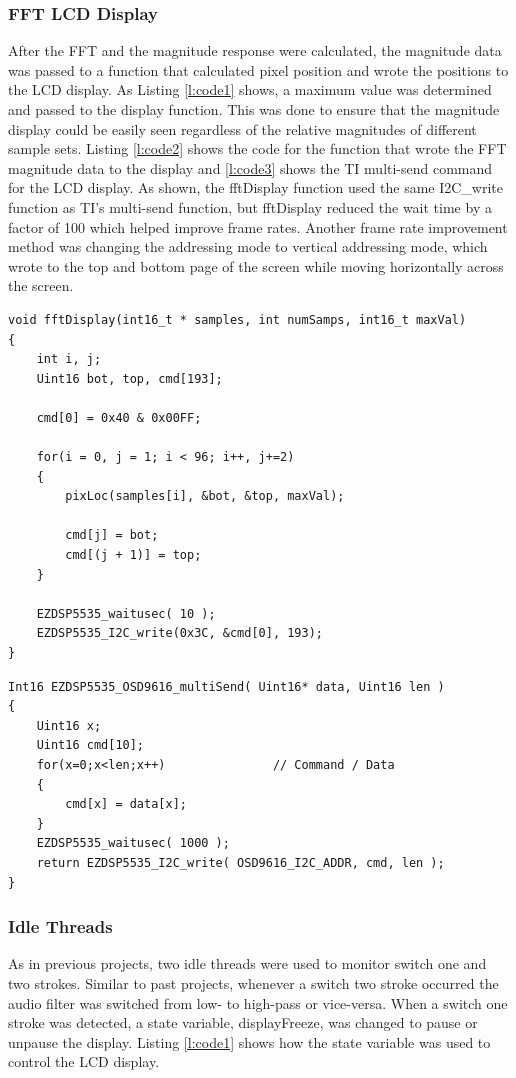 \documentclass[11pt,pdftex,portrait,letterpaper]{article}
\begin{document}
\subsubsection {FFT LCD Display}
After the FFT and the magnitude response were calculated, the magnitude data was passed to a function that calculated pixel position and wrote the positions to the LCD display. As Listing \ref{l:code1} shows, a maximum value was determined and passed to the display function. This was done to ensure that the magnitude display could be easily seen regardless of the relative magnitudes of different sample sets. Listing \ref{l:code2} shows the code for the function that wrote the FFT magnitude data to the display and \ref{l:code3} shows the TI multi-send command for the LCD display. As shown, the fftDisplay function used the same I2C\_write function as TI's multi-send function, but fftDisplay reduced the wait time by a factor of 100 which helped improve frame rates. Another frame rate improvement method was changing the addressing mode to vertical addressing mode, which wrote to the top and bottom page of the screen while moving horizontally across the screen. 

\begin{lstlisting}[caption={LCD display function}, label=l:code2]
void fftDisplay(int16_t * samples, int numSamps, int16_t maxVal)
{
	int i, j;
	Uint16 bot, top, cmd[193];

	cmd[0] = 0x40 & 0x00FF;

	for(i = 0, j = 1; i < 96; i++, j+=2)
	{
		pixLoc(samples[i], &bot, &top, maxVal);

		cmd[j] = bot;
		cmd[(j + 1)] = top;
	}

	EZDSP5535_waitusec( 10 );
	EZDSP5535_I2C_write(0x3C, &cmd[0], 193);
}
\end{lstlisting}

\begin{lstlisting}[caption={TI LCD multi-send function}, label=l:code3]
Int16 EZDSP5535_OSD9616_multiSend( Uint16* data, Uint16 len )
{
    Uint16 x;
    Uint16 cmd[10];
    for(x=0;x<len;x++)               // Command / Data
    {
    	cmd[x] = data[x];
    }
    EZDSP5535_waitusec( 1000 );
    return EZDSP5535_I2C_write( OSD9616_I2C_ADDR, cmd, len );
}
\end{lstlisting}

\subsubsection {Idle Threads}
As in previous projects, two idle threads were used to monitor switch one and two strokes. Similar to past projects, whenever a switch two stroke occurred the audio filter was switched from low- to high-pass or vice-versa. When a switch one stroke was detected, a state variable, displayFreeze, was changed to pause or unpause the display. Listing \ref{l:code1} shows how the state variable was used to control the LCD display. 
\end{document}
